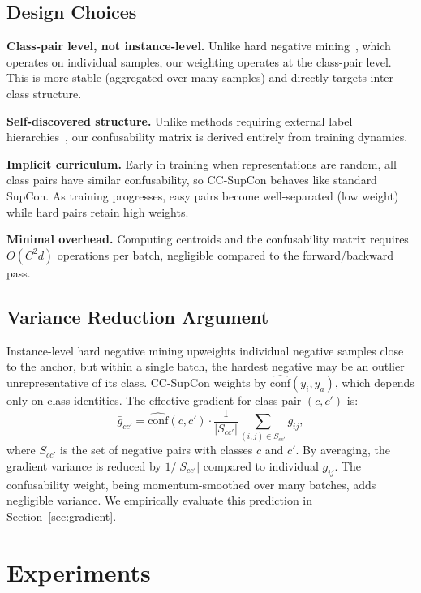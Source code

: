 \documentclass{article}
\newcommand{\conf}{\widehat{\mathrm{conf}}}
\begin{document}
\subsection{Design Choices}

\textbf{Class-pair level, not instance-level.} Unlike hard negative mining~\citep{robinson2021contrastive}, which operates on individual samples, our weighting operates at the class-pair level. This is more stable (aggregated over many samples) and directly targets inter-class structure.

\textbf{Self-discovered structure.} Unlike methods requiring external label hierarchies~\citep{zhang2022use}, our confusability matrix is derived entirely from training dynamics.

\textbf{Implicit curriculum.} Early in training when representations are random, all class pairs have similar confusability, so CC-SupCon behaves like standard SupCon. As training progresses, easy pairs become well-separated (low weight) while hard pairs retain high weights.

\textbf{Minimal overhead.} Computing centroids and the confusability matrix requires $O(C^2 d)$ operations per batch, negligible compared to the forward/backward pass.

\subsection{Variance Reduction Argument}
\label{sec:variance}

Instance-level hard negative mining upweights individual negative samples close to the anchor, but within a single batch, the hardest negative may be an outlier unrepresentative of its class. CC-SupCon weights by $\conf(y_i, y_a)$, which depends only on class identities. The effective gradient for class pair $(c, c')$ is:
\begin{equation}
\bar{g}_{cc'} = \conf(c, c') \cdot \frac{1}{|S_{cc'}|} \sum_{(i,j) \in S_{cc'}} g_{ij},
\end{equation}
where $S_{cc'}$ is the set of negative pairs with classes $c$ and $c'$. By averaging, the gradient variance is reduced by $1/|S_{cc'}|$ compared to individual $g_{ij}$. The confusability weight, being momentum-smoothed over many batches, adds negligible variance. We empirically evaluate this prediction in Section~\ref{sec:gradient}.


\section{Experiments}
\label{sec:experiments}
\end{document}
